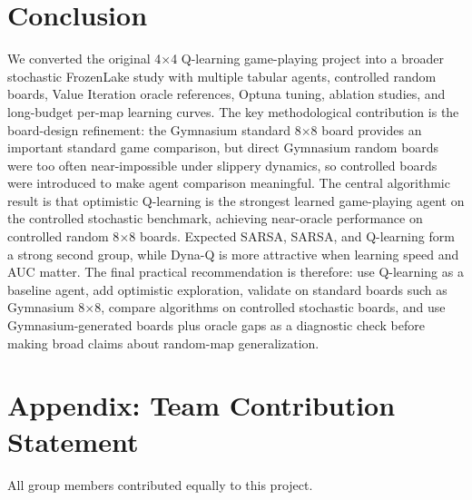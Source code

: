 \documentclass[10pt]{article}
\begin{document}
\section{Conclusion}
We converted the original 4$\times$4 Q-learning game-playing project into a broader stochastic FrozenLake study with multiple tabular agents, controlled random boards, Value Iteration oracle references, Optuna tuning, ablation studies, and long-budget per-map learning curves. The key methodological contribution is the board-design refinement: the Gymnasium standard 8$\times$8 board provides an important standard game comparison, but direct Gymnasium random boards were too often near-impossible under slippery dynamics, so controlled boards were introduced to make agent comparison meaningful. The central algorithmic result is that optimistic Q-learning is the strongest learned game-playing agent on the controlled stochastic benchmark, achieving near-oracle performance on controlled random 8$\times$8 boards. Expected SARSA, SARSA, and Q-learning form a strong second group, while Dyna-Q is more attractive when learning speed and AUC matter. The final practical recommendation is therefore: use Q-learning as a baseline agent, add optimistic exploration, validate on standard boards such as Gymnasium 8$\times$8, compare algorithms on controlled stochastic boards, and use Gymnasium-generated boards plus oracle gaps as a diagnostic check before making broad claims about random-map generalization.





\appendix
\section*{Appendix: Team Contribution Statement}

All group members contributed equally to this project.
\end{document}
